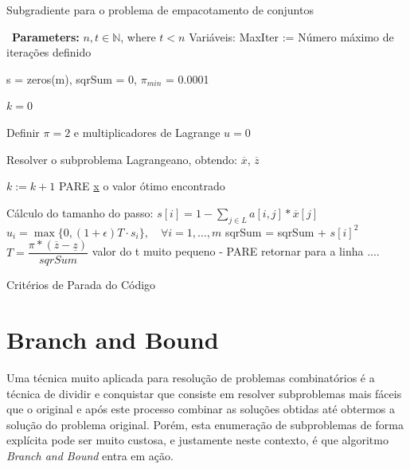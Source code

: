 \documentclass{article}
\begin{document}
	\begin{algorithm}
    \caption{Subgradiente para o problema de empacotamento de conjuntos}
        \begin{algorithmic}[1]
            \Statex \textbullet~\textbf{Parameters:} $n, t \in \mathbb{N}$, where $t < n$
            \State Variáveis:
            \State MaxIter := Número máximo de iterações definido
            
            \State s = zeros(m), sqrSum = 0, $\pi_{min}$ = 0.0001
            
            \State $k = 0$ 
            
            \State Definir $\pi = 2$ e multiplicadores de Lagrange $u = 0$
            
            \State Resolver o subproblema Lagrangeano, obtendo: $\overline{x}$, $\overline{z}$
            
            \State $k := k + 1$
            \State {}  
            \State \Return PARE
            \State \EndIf
            \State {}  
            \State \Return \underline{x} 
            \State \EndIf
            \State {}  
            \State \Return o valor ótimo encontrado
            \State \EndIf
            
    
            \Statex
            \Statex Cálculo do tamanho do passo: 
            \State 
            \State $s[i] = 1 - \sum_{j\in L} a[i,j]*\overline{x}[j]$
            \State $u_i = \max \{0,(1+ \epsilon) T \cdot s_i\}, \quad \forall i= 1,\dots,m$
            \State sqrSum = sqrSum + $s[i]^2$
            \EndFor
            \State $T = \dfrac{\pi * (\overline{z} - \underline{z})}{sqrSum} $
            \State {}
            \State \Return valor do t muito pequeno - PARE
            \State \EndIf
            \State retornar para a linha ....
    
    
            \Statex
            \Statex Critérios de Parada do Código
            
    
    
        \end{algorithmic}
    \end{algorithm}
	
	
	\section{Branch and Bound}\label{sec:BB}
	Uma técnica muito aplicada para resolução de problemas combinatórios é a técnica de dividir e conquistar que consiste em resolver subproblemas mais fáceis que o original e após este processo combinar as soluções obtidas até obtermos a solução do problema original. Porém, esta enumeração de subproblemas de forma explícita pode ser muito custosa, e justamente neste contexto, é que algoritmo \emph{Branch and Bound} entra em ação.
	
\end{document}
